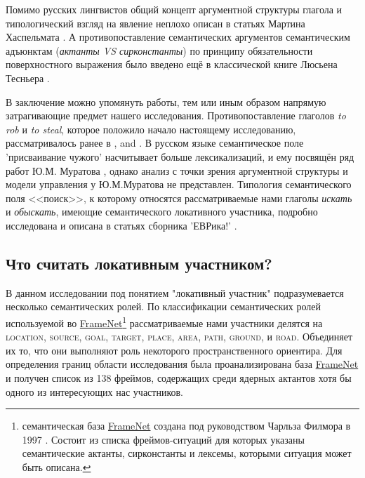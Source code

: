 \par Помимо русских лингвистов общий концепт аргументной структуры глагола и типологический взгляд на явление неплохо описан в статьях Мартина Хаспельмата \citep{haspelmath2004valency, haspelmath2015comparing}. А противопоставление семантических аргументов семантическим адъюнктам (\textit{актанты VS сирконстанты}) по принципу обязательности поверхностного выражения было введено ещё в классической книге Люсьена Тесньера \citep{tesniere1959elements}.

\par В заключение можно упомянуть работы, тем или иным образом напрямую затрагивающие предмет нашего исследования. Противопоставление глаголов \textit{to rob} и \textit{to steal}, которое положило начало настоящему исследованию, рассматривалось ранее в   \citep[45-48]{goldberg1995constructions}, \citep{thorgren2005transaction} and \citep{van2007role}. В русском языке семантическое поле 'присваивание чужого' насчитывает больше лексикализаций, и ему посвящён ряд работ Ю.М. Муратова \citep{муратов2014красться, муратовгенетическая}, однако анализ с точки зрения аргументной структуры и модели управления у Ю.М.Муратова не представлен. Типология семантического поля <<поиск>>, к которому относятся рассматриваемые нами глаголы \textit{искать} и \textit{обыскать}, имеющие семантического локативного участника, подробно исследована и описана в статьях сборника 'ЕВРика!' \citep{еврика}.

\subsection{Что считать локативным участником?}

\par В данном исследовании под понятием "локативный участник" подразумевается несколько семантических ролей. По классификации семантических ролей используемой во \hyperlink{fn}{FrameNet}\footnote{семантическая база \hyperlink{fn}{FrameNet} создана под руководством Чарльза Филмора в 1997 \citep{baker1998berkeley}. Состоит из списка фреймов-ситуаций для которых указаны семантические актанты, сирконстанты и лексемы, которыми ситуация может быть описана.} рассматриваемые нами участники делятся на \textsc{location, source, goal, target, place, area, path, ground}, и \textsc{road}. Объединяет их то, что они выполняют роль некоторого пространственного ориентира. Для определения границ области исследования была проанализирована база \hyperlink{fn}{FrameNet} и получен список из 138 фреймов, содержащих среди ядерных актантов хотя бы одного из интересующих нас участников.

